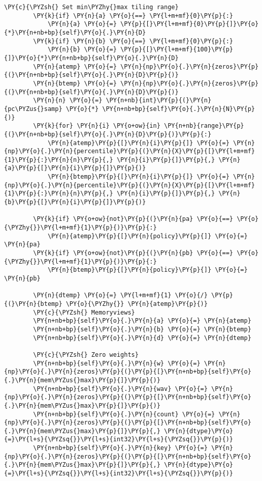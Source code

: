 \begin{Verbatim}[commandchars=\\\{\}]
        \PY{c}{\PYZsh{} Set min\PYZhy{}max tiling range}
        \PY{k}{if} \PY{n}{a} \PY{o}{==} \PY{l+m+mf}{0}\PY{p}{:}
            \PY{n}{a} \PY{o}{=} \PY{p}{[}\PY{l+m+mf}{0}\PY{p}{]}\PY{o}{*}\PY{n+nb+bp}{self}\PY{o}{.}\PY{n}{D}
        \PY{k}{if} \PY{n}{b} \PY{o}{==} \PY{l+m+mf}{0}\PY{p}{:}
            \PY{n}{b} \PY{o}{=} \PY{p}{[}\PY{l+m+mf}{100}\PY{p}{]}\PY{o}{*}\PY{n+nb+bp}{self}\PY{o}{.}\PY{n}{D}
        \PY{n}{atemp} \PY{o}{=} \PY{n}{np}\PY{o}{.}\PY{n}{zeros}\PY{p}{(}\PY{n+nb+bp}{self}\PY{o}{.}\PY{n}{D}\PY{p}{)}
        \PY{n}{btemp} \PY{o}{=} \PY{n}{np}\PY{o}{.}\PY{n}{zeros}\PY{p}{(}\PY{n+nb+bp}{self}\PY{o}{.}\PY{n}{D}\PY{p}{)}
        \PY{n}{n} \PY{o}{=} \PY{n+nb}{int}\PY{p}{(}\PY{n}{pc\PYZus{}samp} \PY{o}{*} \PY{n+nb+bp}{self}\PY{o}{.}\PY{n}{N}\PY{p}{)}
        \PY{k}{for} \PY{n}{i} \PY{o+ow}{in} \PY{n+nb}{range}\PY{p}{(}\PY{n+nb+bp}{self}\PY{o}{.}\PY{n}{D}\PY{p}{)}\PY{p}{:}
            \PY{n}{atemp}\PY{p}{[}\PY{n}{i}\PY{p}{]} \PY{o}{=} \PY{n}{np}\PY{o}{.}\PY{n}{percentile}\PY{p}{(}\PY{n}{X}\PY{p}{[}\PY{l+m+mf}{1}\PY{p}{:}\PY{n}{n}\PY{p}{,} \PY{n}{i}\PY{p}{]}\PY{p}{,} \PY{n}{a}\PY{p}{[}\PY{n}{i}\PY{p}{]}\PY{p}{)}
            \PY{n}{btemp}\PY{p}{[}\PY{n}{i}\PY{p}{]} \PY{o}{=} \PY{n}{np}\PY{o}{.}\PY{n}{percentile}\PY{p}{(}\PY{n}{X}\PY{p}{[}\PY{l+m+mf}{1}\PY{p}{:}\PY{n}{n}\PY{p}{,} \PY{n}{i}\PY{p}{]}\PY{p}{,} \PY{n}{b}\PY{p}{[}\PY{n}{i}\PY{p}{]}\PY{p}{)}
        
        \PY{k}{if} \PY{o+ow}{not}\PY{p}{(}\PY{n}{pa} \PY{o}{==} \PY{o}{\PYZhy{}}\PY{l+m+mf}{1}\PY{p}{)}\PY{p}{:}
            \PY{n}{atemp}\PY{p}{[}\PY{n}{policy}\PY{p}{]} \PY{o}{=} \PY{n}{pa}
        \PY{k}{if} \PY{o+ow}{not}\PY{p}{(}\PY{n}{pb} \PY{o}{==} \PY{o}{\PYZhy{}}\PY{l+m+mf}{1}\PY{p}{)}\PY{p}{:}
            \PY{n}{btemp}\PY{p}{[}\PY{n}{policy}\PY{p}{]} \PY{o}{=} \PY{n}{pb}

        \PY{n}{dtemp} \PY{o}{=} \PY{l+m+mf}{1} \PY{o}{/} \PY{p}{(}\PY{n}{btemp} \PY{o}{\PYZhy{}} \PY{n}{atemp}\PY{p}{)}
        \PY{c}{\PYZsh{} Memoryviews}
        \PY{n+nb+bp}{self}\PY{o}{.}\PY{n}{a} \PY{o}{=} \PY{n}{atemp}
        \PY{n+nb+bp}{self}\PY{o}{.}\PY{n}{b} \PY{o}{=} \PY{n}{btemp}
        \PY{n+nb+bp}{self}\PY{o}{.}\PY{n}{d} \PY{o}{=} \PY{n}{dtemp}

        \PY{c}{\PYZsh{} Zero weights}
        \PY{n+nb+bp}{self}\PY{o}{.}\PY{n}{w} \PY{o}{=} \PY{n}{np}\PY{o}{.}\PY{n}{zeros}\PY{p}{(}\PY{p}{[}\PY{n+nb+bp}{self}\PY{o}{.}\PY{n}{mem\PYZus{}max}\PY{p}{]}\PY{p}{)}
        \PY{n+nb+bp}{self}\PY{o}{.}\PY{n}{wav} \PY{o}{=} \PY{n}{np}\PY{o}{.}\PY{n}{zeros}\PY{p}{(}\PY{p}{[}\PY{n+nb+bp}{self}\PY{o}{.}\PY{n}{mem\PYZus{}max}\PY{p}{]}\PY{p}{)}
        \PY{n+nb+bp}{self}\PY{o}{.}\PY{n}{count} \PY{o}{=} \PY{n}{np}\PY{o}{.}\PY{n}{zeros}\PY{p}{(}\PY{p}{[}\PY{n+nb+bp}{self}\PY{o}{.}\PY{n}{mem\PYZus{}max}\PY{p}{]}\PY{p}{,} \PY{n}{dtype}\PY{o}{=}\PY{l+s}{\PYZsq{}}\PY{l+s}{int32}\PY{l+s}{\PYZsq{}}\PY{p}{)}
        \PY{n+nb+bp}{self}\PY{o}{.}\PY{n}{key} \PY{o}{=} \PY{n}{np}\PY{o}{.}\PY{n}{zeros}\PY{p}{(}\PY{p}{[}\PY{n+nb+bp}{self}\PY{o}{.}\PY{n}{mem\PYZus{}max}\PY{p}{]}\PY{p}{,} \PY{n}{dtype}\PY{o}{=}\PY{l+s}{\PYZsq{}}\PY{l+s}{int32}\PY{l+s}{\PYZsq{}}\PY{p}{)}
        

\end{Verbatim}
